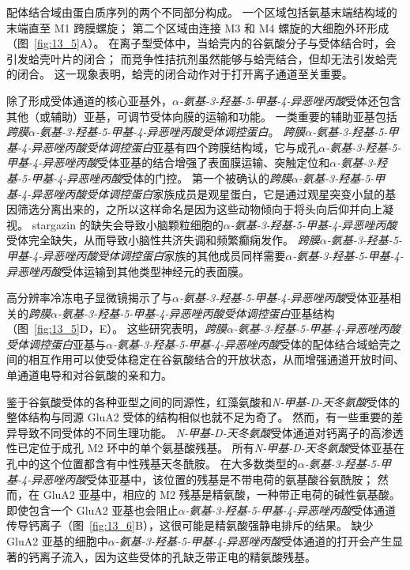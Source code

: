配体结合域由蛋白质序列的两个不同部分构成。
一个区域包括氨基末端结构域的末端直至 M1 跨膜螺旋；
第二个区域由连接 M3 和 M4 螺旋的大细胞外环形成（图~\ref{fig:13_5}A）。
在离子型受体中，当蛤壳内的谷氨酸分子与受体结合时，会引发蛤壳叶片的闭合；
而竞争性拮抗剂虽然能够与蛤壳结合，但却无法引发蛤壳的闭合。
这一现象表明，蛤壳的闭合动作对于打开离子通道至关重要。


除了形成受体通道的核心亚基外，\textit{$\alpha$-氨基-3-羟基-5-甲基-4-异恶唑丙酸}受体还包含其他（或辅助）亚基，可调节受体向膜的运输和功能。
一类重要的辅助亚基包括\textit{跨膜$\alpha$-氨基-3-羟基-5-甲基-4-异恶唑丙酸受体调控蛋白}。
\textit{跨膜$\alpha$-氨基-3-羟基-5-甲基-4-异恶唑丙酸受体调控蛋白}亚基有四个跨膜结构域，它与成孔\textit{$\alpha$-氨基-3-羟基-5-甲基-4-异恶唑丙酸}受体亚基的结合增强了表面膜运输、突触定位和\textit{$\alpha$-氨基-3-羟基-5-甲基-4-异恶唑丙酸}受体的门控。
第一个被确认的\textit{跨膜$\alpha$-氨基-3-羟基-5-甲基-4-异恶唑丙酸受体调控蛋白}家族成员是观星蛋白，它是通过观星突变小鼠的基因筛选分离出来的，之所以这样命名是因为这些动物倾向于将头向后仰并向上凝视。
stargazin 的缺失会导致小脑颗粒细胞的\textit{$\alpha$-氨基-3-羟基-5-甲基-4-异恶唑丙酸}受体完全缺失，从而导致小脑性共济失调和频繁癫痫发作。
\textit{跨膜$\alpha$-氨基-3-羟基-5-甲基-4-异恶唑丙酸受体调控蛋白}家族的其他成员同样需要\textit{$\alpha$-氨基-3-羟基-5-甲基-4-异恶唑丙酸}受体运输到其他类型神经元的表面膜。


高分辨率冷冻电子显微镜揭示了与\textit{$\alpha$-氨基-3-羟基-5-甲基-4-异恶唑丙酸}受体亚基相关的\textit{跨膜$\alpha$-氨基-3-羟基-5-甲基-4-异恶唑丙酸受体调控蛋白}亚基结构（图~\ref{fig:13_5}D，E）。
这些研究表明，\textit{跨膜$\alpha$-氨基-3-羟基-5-甲基-4-异恶唑丙酸受体调控蛋白}亚基与\textit{$\alpha$-氨基-3-羟基-5-甲基-4-异恶唑丙酸}受体的配体结合域蛤壳之间的相互作用可以使受体稳定在谷氨酸结合的开放状态，从而增强通道开放时间、单通道电导和对谷氨酸的亲和力。


鉴于谷氨酸受体的各种亚型之间的同源性，红藻氨酸和\textit{N-甲基-D-天冬氨酸}受体的整体结构与同源 GluA2 受体的结构相似也就不足为奇了。
然而，有一些重要的差异导致不同受体的不同生理功能。 
\textit{N-甲基-D-天冬氨酸}受体通道对钙离子的高渗透性已定位于成孔 M2 环中的单个氨基酸残基。
所有\textit{N-甲基-D-天冬氨酸}受体亚基在孔中的这个位置都含有中性残基天冬酰胺。
在大多数类型的\textit{$\alpha$-氨基-3-羟基-5-甲基-4-异恶唑丙酸}受体亚基中，该位置的残基是不带电荷的氨基酸谷氨酰胺；
然而，在 GluA2 亚基中，相应的 M2 残基是精氨酸，一种带正电荷的碱性氨基酸。
即使包含一个 GluA2 亚基也会阻止\textit{$\alpha$-氨基-3-羟基-5-甲基-4-异恶唑丙酸}受体通道传导钙离子（图~\ref{fig:13_6}B），这很可能是精氨酸强静电排斥的结果。
缺少 GluA2 亚基的细胞中\textit{$\alpha$-氨基-3-羟基-5-甲基-4-异恶唑丙酸}受体通道的打开会产生显著的钙离子流入，因为这些受体的孔缺乏带正电的精氨酸残基。



